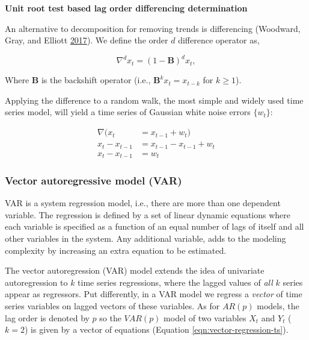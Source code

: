 \documentclass[12pt,]{article}
\begin{document}
\textbf{Unit root test based lag order differencing determination}

An alternative to decomposition for removing trends is differencing (Woodward, Gray, and Elliott \protect\hyperlink{ref-woodward2017applied}{2017}). We define the order \(d\) difference operator as,

\begin{equation}
\nabla^d x_t = (1-\mathbf{B})^d x_t,
\label{eqn:order-d-difference-operator}
\end{equation}

Where \(\mathbf{B}\) is the backshift operator (i.e., \(\mathbf{B}^k x_t = x_{t-k}\) for \(k \geq 1\)).

Applying the difference to a random walk, the most simple and widely used time series model, will yield a time series of Gaussian white noise errors \(\{w_t\}\):

\begin{equation}
  \begin{aligned}
    \nabla (x_t &= x_{t-1} + w_t) \\
    x_t - x_{t-1} &= x_{t-1} - x_{t-1} + w_t \\
    x_t - x_{t-1} &= w_t
  \end{aligned}
  \label{eqn:random-walk-series}
\end{equation}

\hypertarget{vector-autoregressive-model-var}{%
\subsubsection{Vector autoregressive model (VAR)}\label{vector-autoregressive-model-var}}

VAR is a system regression model, i.e., there are more than one dependent variable. The regression is defined by a set of linear dynamic equations where each variable is specified as a function of an equal number of lags of itself and all other variables in the system. Any additional variable, adds to the modeling complexity by increasing an extra equation to be estimated.

The vector autoregression (VAR) model extends the idea of univariate autoregression to \(k\) time series regressions, where the lagged values of \emph{all} \(k\) series appear as regressors. Put differently, in a VAR model we regress a \emph{vector} of time series variables on lagged vectors of these variables. As for \(AR(p)\) models, the lag order is denoted by \(p\) so the \(VAR(p)\) model of two variables \(X_t\) and \(Y_t\) (\(k=2\)) is given by a vector of equations (Equation \ref{eqn:vector-regression-ts}).
\end{document}
